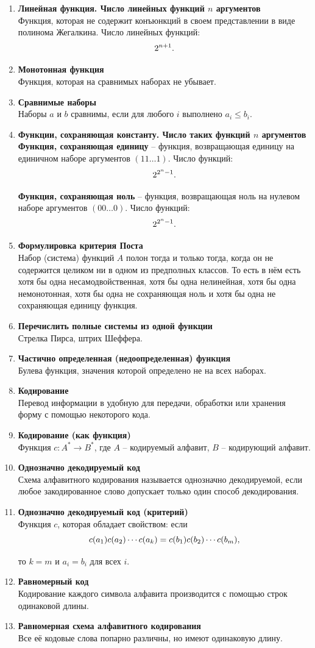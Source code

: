 \documentclass[a4paper,12pt,oneside]{article}
\newcommand{\BigDisp}[1]{%
\[
{\Large\displaystyle #1}
\]
}
\newcommand{\DefItem}[2]{\item \textbf{#1}\\#2}
\begin{document}
\begin{enumerate}[label=\arabic*.]
\DefItem{Линейная функция. Число линейных функций $n$ аргументов}{Функция, которая не содержит конъюнкций в своем представлении в виде полинома Жегалкина. Число линейных функций:
\BigDisp{2^{n+1}.}}

\DefItem{Монотонная функция}{Функция, которая на сравнимых наборах не убывает.}

\DefItem{Сравнимые наборы}{Наборы $a$ и $b$ сравнимы, если для любого $i$ выполнено $a_i \le b_i$.}

\DefItem{Функции, сохраняющая константу. Число таких функций $n$ аргументов}{\textbf{Функция, сохраняющая единицу} – функция, возвращающая единицу на единичном наборе аргументов $(11\dots 1)$. Число функций:
\BigDisp{2^{2^{n}-1}.}
\textbf{Функция, сохраняющая ноль} – функция, возвращающая ноль на нулевом наборе аргументов $(00\dots 0)$. Число функций:
\BigDisp{2^{2^{n}-1}.}}

\DefItem{Формулировка критерия Поста}{Набор (система) функций $A$ полон тогда и только тогда, когда он не содержится целиком ни в одном из предполных классов. То есть в нём есть хотя бы одна несамодвойственная, хотя бы одна нелинейная, хотя бы одна немонотонная, хотя бы одна не сохраняющая ноль и хотя бы одна не сохраняющая единицу функция.}

\DefItem{Перечислить полные системы из одной функции}{Стрелка Пирса, штрих Шеффера.}

\DefItem{Частично определенная (недоопределенная) функция}{Булева функция, значения которой определено не на всех наборах.}

\DefItem{Кодирование}{Перевод информации в удобную для передачи, обработки или хранения форму с помощью некоторого кода.}

\DefItem{Кодирование (как функция)}{Функция $c: A^* \to B^*$, где $A$ – кодируемый алфавит, $B$ – кодирующий алфавит.}

\DefItem{Однозначно декодируемый код}{Схема алфавитного кодирования называется однозначно декодируемой, если любое закодированное слово допускает только один способ декодирования.}

\DefItem{Однозначно декодируемый код (критерий)}{Функция $c$, которая обладает свойством: если
\BigDisp{c(a_1)c(a_2)\cdots c(a_k)=c(b_1)c(b_2)\cdots c(b_m),}
то $k=m$ и $a_i=b_i$ для всех $i$.}

\DefItem{Равномерный код}{Кодирование каждого символа алфавита производится с помощью строк одинаковой длины.}

\DefItem{Равномерная схема алфавитного кодирования}{Все её кодовые слова попарно различны, но имеют одинаковую длину.}


\end{enumerate}
\end{document}
